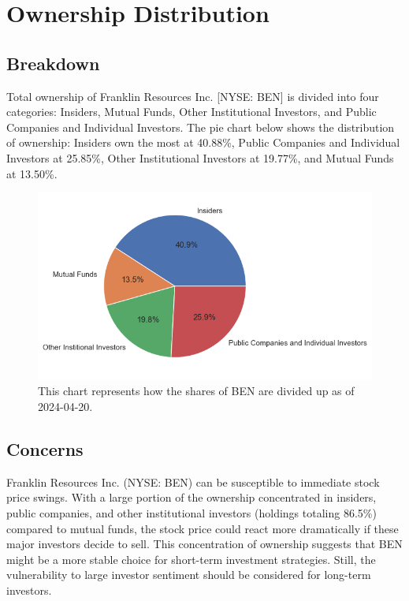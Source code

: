 \documentclass[9pt,a4paper,twoside]{tau}
\begin{document}
\section{Ownership Distribution}
    \subsection{Breakdown}
        
        Total ownership of Franklin Resources Inc. [NYSE: BEN] is divided into four categories: Insiders, Mutual Funds, Other Institutional Investors, and Public Companies and Individual Investors. The pie chart below shows the distribution of ownership: Insiders own the most at 40.88\%, Public Companies and Individual Investors at 25.85\%, Other Institutional Investors at 19.77\%, and Mutual Funds at 13.50\%.

            \begin{figure}[H]
                \centering
                \includegraphics[width=0.85\columnwidth]{images/OwnershipPieChart.png}
                \caption{This chart represents how the shares of BEN are divided up as of 2024-04-20.}
                \label{fig:figure}
            \end{figure}

    \subsection{Concerns}
    
        Franklin Resources Inc. (NYSE: BEN) can be susceptible to immediate stock price swings. With a large portion of the ownership concentrated in insiders, public companies, and other institutional investors (holdings totaling 86.5\%) compared to mutual funds, the stock price could react more dramatically if these major investors decide to sell. This concentration of ownership suggests that BEN might be a more stable choice for short-term investment strategies. Still, the vulnerability to large investor sentiment should be considered for long-term investors.
\end{document}
